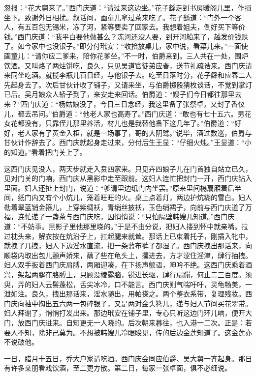 忽报：“花大舅来了。”西门庆道：“请过来这边坐。”花子繇走到书房暖阁儿里，作揖坐下。致谢外日相扰。叙话间，画童儿拿过茶来吃了。花子繇道：“门外一个客人，有五百包无锡米，冻了河，紧等要卖了回家去。我想着姐夫，倒好买下等价钱。”西门庆道：“我平白要他做甚么？冻河还没人要，到开河船来了，越发价钱跌了。如今家中也没银子。”即分付玳安：“收拾放桌儿，家中说，看菜儿来。”一面使画童儿：“请你应二爹来，陪你花爹坐。”不一时，伯爵来到。三人共在一处，围炉饮酒。又叫烙了两炷饼吃，良久，只见吴道官徒弟应春，送节礼疏诰来。西门庆请来同坐吃酒。就揽李瓶儿百日经，与他银子去。吃至日落时分，花子繇和应春二人先起身去了。次后甘伙计收了铺子，又请来坐，与伯爵掷骰猜枚谈话，不觉到掌灯已后。吴月娘众人轿子到了，来安走来回话。伯爵道：“嫂子们今日都往那里去来？”西门庆道：“杨姑娘没了，今日三日念经，我这里备了张祭卓，又封了香仪儿，都去吊问。”伯爵道：“他老人家也高寿了。”西门庆道：“敢也有七十五六。男花女花都没有，只靠侄儿那里养活，材儿也是我替他备下这几年了。”伯爵道：“好好，老人家有了黄金入柜，就是一场事了，哥的大阴骘。”说毕，酒过数巡，伯爵与甘伙计作辞去了。西门庆就起身走过来，分付后生王显：“仔细火烛。”王显道：“小的知道。”看着把门关上了。

这西门庆见没人，两天步就走入贲四家来。只见卉四娘子儿在门首独自站立已久，见对门关的门响，西门庆从黑影中走至跟前。这妇人连忙把封门一开，西门庆钻入里面。妇人还扯上封门，说道：“爹请里边纸门内坐罢。”原来里间槅扇厢着后半间，纸门内又有个小炕儿，笼着旺旺的火。桌上点着灯，两边护炕糊的雪白。妇人勒着翠蓝销金箍儿，上穿紫绸袄，青绡丝披袄，玉色绡裙子，向前与西门庆道了万福，连忙递了一盏茶与西门庆吃，因悄悄说：“只怕隔壁韩嫂儿知道。”西门庆道：“不妨事。黑影子里他那里晓的。”于是不由分说，把妇人搂到怀中就亲嘴。拉过枕头来，解衣按在炕沿子上，扛起腿来就耸。那话上已束着托子，刚插入牝中，就拽了几拽，妇人下边淫水直流，把一条蓝布裤子都湿了。西门庆拽出那话来，向顺袋内取出包儿颤声娇来，蘸了些在龟头上，攮进去，方才涩住淫津，肆行抽拽。妇人双手扳着西门庆肩膊，两厢迎凑，在下扬声颤语，呻吟不绝。这西门庆乘着酒兴，架起两腿在胳膊上，只顾没棱露脑，锐进长驱，肆行扇蹦，何止二三百度。须臾，弄的妇人云髻蓬松，舌尖冰冷，口不能言。西门庆则气喘吁吁，灵龟畅美，一泄如注。良久，拽出那话来，淫水随出，用帕搽之。两个整衣系带，复理残妆。西门庆向袖中掏出五六两一包碎银子，又是两对金头簪儿，递与妇人节间买花翠带。妇人拜谢了，悄悄打发出来。那边玳安在铺子里，专心只听这边门环儿响，便开大门，放西门庆进来。自知更无一人晓的。后次朝来暮往，也入港一二次。正是：若要人不知，除非己莫为。不想被韩嫂儿冷眼睃见，传的后边金莲知道了。这金莲亦不说破他。

一日，腊月十五日，乔大户家请吃酒。西门庆会同应伯爵、吴大舅一齐起身。那日有许多亲朋看戏饮酒，至二更方散。第二日，每家一张卓面，俱不必细说。

